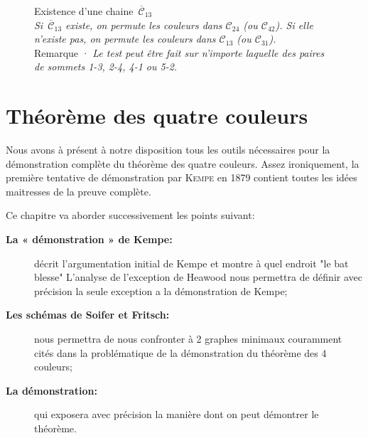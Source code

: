 \documentclass[french]{report}
\begin{document}
\begin{figure}
	
	\caption{Existence d'une chaine~$\overline{\mathcal{C}}_{13}$\\\footnotesize\textit{Si~$\overline{\mathcal{C}}_{13}$ existe, on permute les couleurs dans $\mathcal{C}_{24}$ (ou $\mathcal{C}_{42}$). Si elle n'existe pas, on permute les couleurs dans $\mathcal{C}_{13}$ (ou $\mathcal{C}_{31}$).}\\\footnotesize{Remarque · \textit{Le test peut être fait sur n'importe laquelle des paires de sommets 1-3, 2-4, 4-1 ou 5-2. }}}
	\label{fig:5_pentagone_5col2}
\end{figure}

\chapter{Théorème des quatre couleurs}

Nous avons à présent à notre disposition tous les outils nécessaires pour la démonstration complète du théorème des quatre couleurs. Assez ironiquement, la première tentative de démonstration par \textsc{Kempe} en 1879 contient toutes les idées maitresses de la preuve complète.\\
\begin{changemargin}{0cm}{0cm}
Ce chapitre va aborder successivement les points suivant:
\end{changemargin}
\begin{description}

\item[\textbf{La « démonstration » de Kempe:}] décrit l'argumentation initial de Kempe et montre à quel endroit "le bat blesse"
L'analyse de l’exception de Heawood nous permettra de définir avec précision la seule exception a la démonstration de Kempe; 
\item[\textbf{Les schémas de Soifer et Fritsch:}] nous permettra de nous confronter à 2 graphes minimaux couramment cités dans la problématique de la démonstration du théorème des 4 couleurs;
\item[\textbf{La démonstration:}] qui exposera avec précision la manière dont on peut démontrer le théorème.\\
\end{description}
\end{document}
